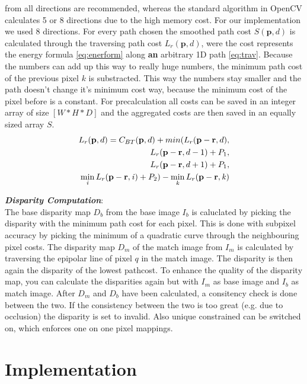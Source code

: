\documentclass[a4paper]{article}
\begin{document}
from all directions are recommended, whereas the standard algorithm in
OpenCV calculates 5 or 8 directions due to the high memory cost. For
our implementation we used 8 directions. For every path chosen the
smoothed path cost $S(\mathbf{p},d)$ is calculated through the
traversing path cost $L_{r}(\mathbf{p},d)$, were the cost represents
the energy formula \eqref{eq:enerform} along \textbf{an} arbitrary 1D
path \eqref{eq:trav}. Because the numbers can add up this way to
really huge numbers, the minimum path cost of the previous pixel $\mathit{k}$ is
substracted. This way the numbers stay smaller and the path doesn't
change it's minimum cost way, because the minimum cost of the pixel
before is a constant.  For precalculation all costs can be saved in an
integer array of size $[W*H*D]$ and the aggregated costs are then
saved in an equally sized array $S$.
\begin{align}
  \label{eq:trav}
  L_{r}(\mathbf{p},d) = 
  C_{BT}(\mathbf{p},d) + min(L_{r}(\mathbf{p} -
  \mathbf{r}, d), 
  \notag\\
  L_{r}(\mathbf{p} - \mathbf{r}, d - 1) + P_1,
  \notag\\
  L_{r}(\mathbf{p} - \mathbf{r}, d + 1) + P_1,
  \\
  \displaystyle\min\limits_{\mathit{i}} L_{r}(\mathbf{p} - \mathbf{r}, \mathit{i}) +
  P_2) -
  \displaystyle\min\limits_{\mathit{k}} L_{r}(\mathbf{p} -
  \mathbf{r}, \mathit{k})\notag
\end{align}

\emph{\textbf{Disparity Computation}}:\\
The base disparity map $D_b$ from the base image $I_b$ is caluclated by
picking the disparity with the minimum path cost for each pixel. This
is done with subpixel accuracy by picking the minimum of a quadratic
curve through the neighbouring pixel costs. The disparity map $D_m$ of
the match image from $I_m$ is calculated by traversing the epipolar
line of pixel $q$ in the match image. The disparity is then again the
disparity of the lowest pathcost. To enhance the quality of the
disparity map, you can calculate the disparities again but with $I_m$
as base image and $I_b$ as match image. After $D_m$ and $D_b$ have
been calculated, a consitency check is done between the two. If the
consistency between the two is too great (e.g. due to occlusion) the
disparity is set to invalid. Also unique constrained can be switched
on, which enforces one on one pixel mappings.

\section{Implementation}
\end{document}
